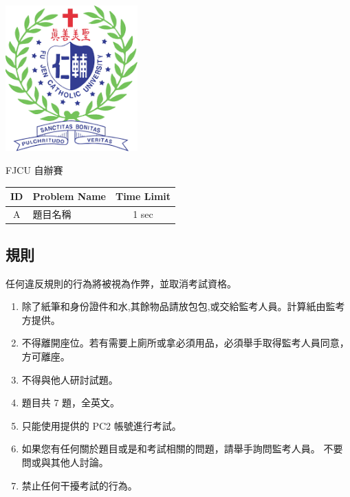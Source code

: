 \quad \vspace{1cm}
\begin{center}
\includegraphics[width=2in]{image/fjcu.png} \\
\vspace{1cm}
\begin{bfseries}
\Large{FJCU 自辦賽} \\
\end{bfseries}
\end{center}
\vspace{1cm}
\begin{center}
    \begin{tabular}{clc}
        \toprule
            ID & Problem Name & Time Limit \\
        \midrule
            A & 題目名稱 & 1 sec \\
        \bottomrule
    \end{tabular}
\end{center}
\thispagestyle{empty}
\clearpage  %
\quad
\subsection*{規則}
任何違反規則的行為將被視為作弊，並取消考試資格。
\begin{enumerate}
    \item 除了紙筆和身份證件和水,其餘物品請放包包,或交給監考人員。計算紙由監考方提供。
    \item 不得離開座位。若有需要上廁所或拿必須用品，必須舉手取得監考人員同意，方可離座。
    \item 不得與他人研討試題。
    \item 題目共 7 題，全英文。
    \item 只能使用提供的 PC2 帳號進行考試。
    \item 如果您有任何關於題目或是和考試相關的問題，請舉手詢問監考人員。 不要問或與其他人討論。
    \item 禁止任何干擾考試的行為。
\end{enumerate}
\newpage
